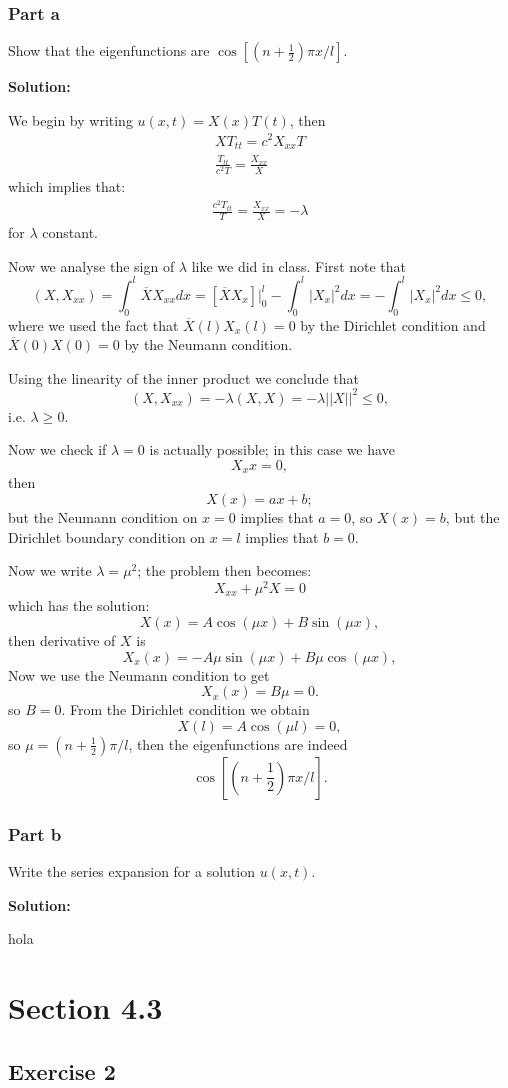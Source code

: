 \documentclass{article}
\begin{document}
\subsubsection{Part a}
Show that the eigenfunctions are $\cos\left[\left(n+\frac{1}{2}\right)\pi x/l\right]$.

\textbf{Solution:}

We begin by writing $u(x,t)=X(x)T(t)$, then
\begin{align*}
XT_{tt}=c^2X_{xx}T\\
\frac{T_{tt}}{c^2T}=\frac{X_{xx}}{X}
\end{align*}
which implies that:
\begin{align*}
\frac{c^2T_{tt}}{T}=\frac{X_{xx}}{X}=-\lambda
\end{align*}
for $\lambda$ constant.

Now we analyse the sign of $\lambda$ like we did in
class. First note that
\[
(X,X_{xx})=\int_0^l\overline{X}X_{xx}dx
=[\overline{X}X_x]\Big|_0^l-\int_0^l|X_x|^2dx
=-\int_0^l|X_x|^2dx\leq 0,
\]
where we used the fact that $\overline{X}(l)X_x(l)=0$ by the Dirichlet
condition and  $\overline{X}(0)X(0)=0$ by the Neumann condition.

Using the linearity of the inner product we conclude that
\[
    (X,X_{xx})=-\lambda(X,X)=-\lambda||X||^2\leq 0,
\]
i.e. $\lambda \geq 0$.

Now we check if $\lambda=0$ is actually possible; in this case we have
\[
X_xx=0,
\]
then
\[
    X(x)=ax+b;
\]
but the Neumann condition on $x=0$ implies that $a=0$, so $X(x)=b$, but the
Dirichlet boundary condition on $x=l$ implies that $b=0$.


Now we write $\lambda=\mu^2$; the problem then becomes:
\[
    X_{xx}+\mu^2X=0
\]
which has the solution:
\[
X(x) = A\cos(\mu x)+B\sin(\mu x),
\]
then derivative of $X$ is
\[
X_x(x) = -A\mu\sin(\mu x)+B\mu\cos(\mu x),
\]
Now we use the Neumann condition to get
\[
    X_x(x)=B\mu=0.
\]
so $B=0$. From the Dirichlet condition we obtain
\[
X(l)=A\cos(\mu l)=0,
\]
so $\mu = (n+\frac{1}{2})\pi/l$, then the eigenfunctions are indeed
\[
\cos\left[\left(n+\frac{1}{2}\right)\pi x/l\right].
\]
\subsubsection{Part b}
Write the series expansion for a solution $u(x,t)$.

\textbf{Solution:}

hola
\section{Section 4.3}
\subsection{Exercise 2}
\end{document}
